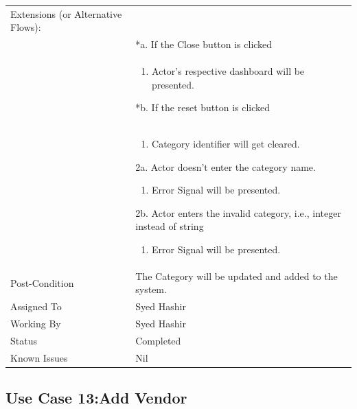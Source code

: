 \documentclass[12pt,a4paper]{article}
\begin{document}
\begin{longtable}{| p{3cm}|p{12cm}|}
Extensions (or Alternative Flows):\\
& *a. If the Close button is clicked \\
& \begin{enumerate}
		\item Actor's respective dashboard will be presented.
	\end{enumerate}
*b. If the reset button is clicked \\
&	\begin{enumerate}
		\item Category identifier will get cleared.
	\end{enumerate}
2a. Actor doesn't enter the category name.
 	\begin{enumerate}
		\item Error Signal will be presented.
	\end{enumerate}
2b. Actor enters the invalid category, i.e., integer instead of string
	\begin{enumerate}
		\item Error Signal will be presented.
	\end{enumerate}
\\ \hline
Post-Condition &    The Category will be updated and added to the system. \\ \hline
Assigned To &  Syed Hashir
\\ \hline
Working By &   Syed Hashir
\\ \hline
Status & 	Completed	
\\ \hline
Known Issues & Nil
\\\hline
\end{longtable}

\subsection{Use Case 13:Add Vendor}
\end{document}
